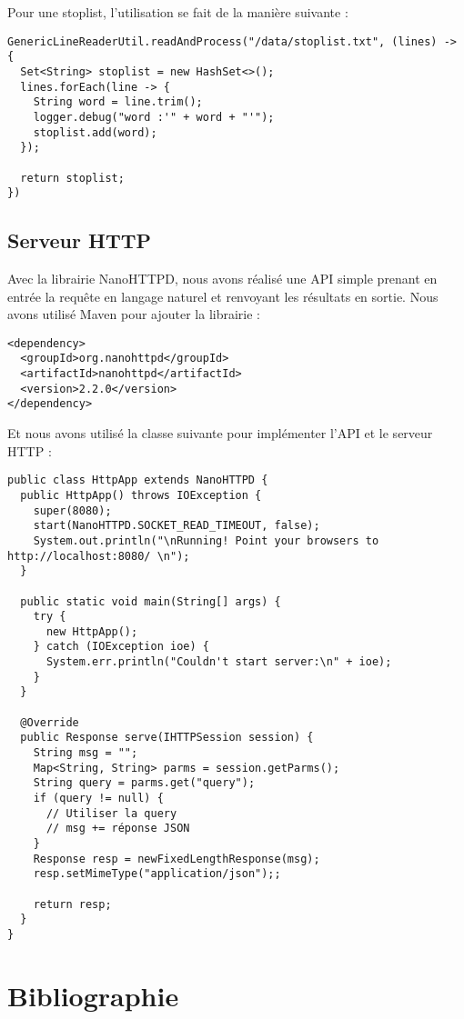 \documentclass[a4paper]{elsarticle}
\begin{document}
Pour une stoplist, l'utilisation se fait de la manière suivante :

\begin{lstlisting}
GenericLineReaderUtil.readAndProcess("/data/stoplist.txt", (lines) -> {
  Set<String> stoplist = new HashSet<>();
  lines.forEach(line -> {
    String word = line.trim();
    logger.debug("word :'" + word + "'");
    stoplist.add(word);
  });

  return stoplist;
})
\end{lstlisting}

\subsection{Serveur HTTP}

Avec la librairie NanoHTTPD, nous avons réalisé une API simple prenant en entrée la requête en langage naturel et renvoyant les résultats en sortie. Nous avons utilisé Maven pour ajouter la librairie :

\begin{lstlisting}[style=xml]
<dependency>
  <groupId>org.nanohttpd</groupId>
  <artifactId>nanohttpd</artifactId>
  <version>2.2.0</version>
</dependency>
\end{lstlisting}

Et nous avons utilisé la classe suivante pour implémenter l'API et le serveur HTTP :

\begin{lstlisting}
public class HttpApp extends NanoHTTPD {
  public HttpApp() throws IOException {
    super(8080);
    start(NanoHTTPD.SOCKET_READ_TIMEOUT, false);
    System.out.println("\nRunning! Point your browsers to http://localhost:8080/ \n");
  }

  public static void main(String[] args) {
    try {
      new HttpApp();
    } catch (IOException ioe) {
      System.err.println("Couldn't start server:\n" + ioe);
    }
  }

  @Override
  public Response serve(IHTTPSession session) {
    String msg = "";
    Map<String, String> parms = session.getParms();
    String query = parms.get("query");
    if (query != null) {
      // Utiliser la query
      // msg += réponse JSON
    }
    Response resp = newFixedLengthResponse(msg);
    resp.setMimeType("application/json");;

    return resp;
  }
}
\end{lstlisting}

\section*{Bibliographie}



\end{document}
